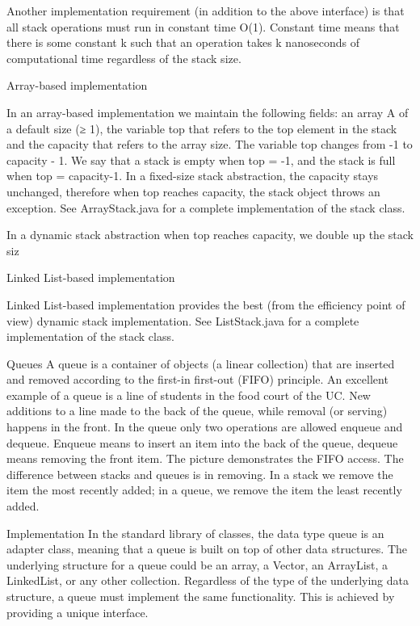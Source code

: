 Another implementation requirement (in addition to the above interface) is that all stack operations must run in constant time O(1). Constant time means that there is some constant k such that an operation takes k nanoseconds of computational time regardless of the stack size.

Array-based implementation


In an array-based implementation we maintain the following fields: an array A of a default size (≥ 1), the variable top that refers to the top element in the stack and the capacity that refers to the array size. The variable top changes from -1 to capacity - 1. We say that a stack is empty when top = -1, and the stack is full when top = capacity-1. In a fixed-size stack abstraction, the capacity stays unchanged, therefore when top reaches capacity, the stack object throws an exception. See ArrayStack.java for a complete implementation of the stack class.

In a dynamic stack abstraction when top reaches capacity, we double up the stack siz

Linked List-based implementation


Linked List-based implementation provides the best (from the efficiency point of view) dynamic stack implementation. See ListStack.java for a complete implementation of the stack class.

Queues
A queue is a container of objects (a linear collection) that are inserted and removed according to the first-in first-out (FIFO) principle. An excellent example of a queue is a line of students in the food court of the UC. New additions to a line made to the back of the queue, while removal (or serving) happens in the front. In the queue only two operations are allowed enqueue and dequeue. Enqueue means to insert an item into the back of the queue, dequeue means removing the front item. The picture demonstrates the FIFO access. The difference between stacks and queues is in removing. In a stack we remove the item the most recently added; in a queue, we remove the item the least recently added.



Implementation
In the standard library of classes, the data type queue is an adapter class, meaning that a queue is built on top of other data structures. The underlying structure for a queue could be an array, a Vector, an ArrayList, a LinkedList, or any other collection. Regardless of the type of the underlying data structure, a queue must implement the same functionality. This is achieved by providing a unique interface.


